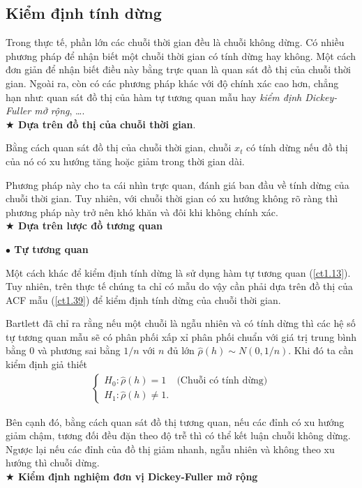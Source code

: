 \documentclass[12pt, a4paper,oneside]{book}
\theoremstyle{definition}
\begin{document}
\subsection{Kiểm định tính dừng \label{kdtd}}
Trong thực tế, phần lớn các chuỗi thời gian đều là chuỗi không dừng. Có nhiều phương pháp để nhận biết một chuỗi thời gian có tính dừng hay không. Một cách đơn giản để nhận biết điều này bằng trực quan là quan sát đồ thị của chuỗi thời gian. Ngoài ra, còn có các phương pháp khác với độ chính xác cao hơn, chẳng hạn như: quan sát đồ thị của hàm tự tương quan mẫu hay \textit{kiểm định Dickey-Fuller mở rộng}, \dots.\\
\textbf{$\bigstar$ Dựa trên đồ thị của chuỗi thời gian}.

Bằng cách quan sát đồ thị của chuỗi thời gian, chuỗi $x_t$ có tính dừng nếu đồ thị của nó có xu hướng tăng hoặc giảm trong thời gian dài.

Phương pháp này cho ta cái nhìn trực quan, đánh giá ban đầu về tính dừng của chuỗi thời gian. Tuy nhiên, với chuỗi thời gian có xu hướng không rõ ràng thì phương pháp này trở nên khó khăn và đôi khi không chính xác.\\
\textbf{$\bigstar$ Dựa trên lược đồ tương quan}

\textbf{$\bullet$ Tự tương quan}

Một cách khác để kiểm định tính dừng là sử dụng hàm tự tương quan (\ref{ct1.13}). Tuy nhiên, trên thực tế chúng ta chỉ có mẫu do vậy cần phải dựa trên đồ thị của ACF mẫu (\ref{ct1.39}) để kiểm định tính dừng của chuỗi thời gian.

Bartlett đã chỉ ra rằng nếu một chuỗi là ngẫu nhiên và có tính dừng thì các hệ số tự tương quan mẫu sẽ có phân phối xấp xỉ phân phối chuẩn với giá trị trung bình bằng 0 và phương sai bằng $1/n$ với $n$ đủ lớn $ \widehat{\rho}(h)\sim N(0,1/n)$.
Khi đó ta cần kiểm định giả thiết
\begin{align*}
\begin{cases} 
H_0: \widehat{\rho}(h)=1 & \text{(Chuỗi có tính dừng)}\\
H_1: \widehat{\rho}(h)\neq1.
\end{cases}
\end{align*}

Bên cạnh đó, bằng cách quan sát đồ thị tương quan, nếu các đỉnh có xu hướng giảm chậm, tương đối đều đặn theo độ trễ thì có thể kết luận chuỗi không dừng. Ngược lại nếu các đỉnh của đồ thị giảm nhanh, ngẫu nhiên và không theo xu hướng thì chuỗi dừng.\\
\textbf{$\bigstar$ Kiểm định nghiệm đơn vị Dickey-Fuller mở rộng} 
\end{document}

